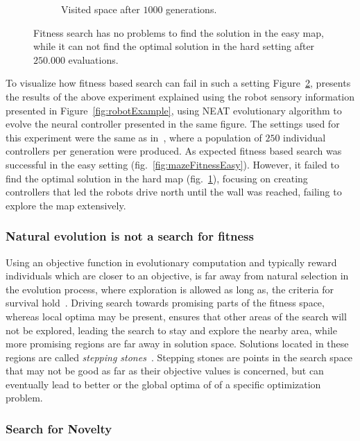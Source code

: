 \begin{figure}[t!]
\begin{subfigure}[b]{0.3\textwidth}
\caption{Visited space after $1000$ generations.}
\label{fig:mazeFitnessHard}
\end{subfigure}
\caption{Fitness search has no problems to find the solution in the easy map, while it can not find the optimal solution in the hard setting after $250.000$ evaluations.}
\label{fig:mazeFitness}
\end{figure}


To visualize how fitness based search can fail in such a setting Figure~\ref{fig:mazeFitness}, presents the results of the above experiment explained using the robot sensory information presented in Figure~\ref{fig:robotExample}, using NEAT evolutionary algorithm to evolve the neural controller presented in the same figure. The settings used for this experiment were the same as in~\citep{lehman2011abandoning}, where a population of $250$ individual controllers per generation were produced. As expected fitness based search was successful in the easy setting (fig.~\ref{fig:mazeFitnessEasy}). However, it failed to find the optimal solution in the hard map (fig.~\ref{fig:mazeFitnessHard}), focusing on creating controllers that led the robots drive north until the wall was reached, failing to explore the map extensively.

\subsubsection*{Natural evolution is not a search for fitness}

Using an objective function in evolutionary computation and typically reward individuals which are closer to an objective, is far away from natural selection in the evolution process, where exploration is allowed as long as, the criteria for survival hold~\citep{lehman2010revising}. Driving search towards promising parts of the fitness space, whereas local optima may be present, ensures that other areas of the search will not be explored, leading the search to stay and explore the nearby area, while more promising regions are far away in solution space. Solutions located in these regions are called \emph{stepping stones}~\citep{lehman2008exploiting,lehman2011abandoning,lehman2010revising,risi2009novelty}. Stepping stones are points in the search space that may not be good as far as their objective values is concerned, but can eventually lead to better or the global optima of of a specific optimization problem.


\subsubsection*{Search for Novelty}

